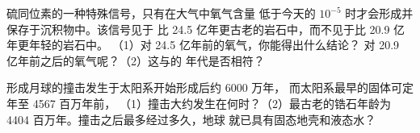 \begin{exercise}[$\star\star\star$]\label{exo:g12:early-earth:14}
 硫同位素的一种特殊信号，只有在大气中氧气含量
 低于今天的 $10^{-5}$ 时才会形成并保存于沉积物中。该信号见于
 比 24.5 亿年更古老的岩石中，而不见于比 20.9 亿年更年轻的岩石中。
 （1）对 24.5 亿年前的氧气，你能得出什么结论？
 对 20.9 亿年前之后的氧气呢？（2）这与的
 年代是否相符？
\end{exercise}

\begin{exercise}[$\star\star\star$]\label{exo:g12:early-earth:15}
 形成月球的撞击发生于太阳系开始形成后约 6000 万年，
 而太阳系最早的固体可定年至 4567 百万年前，
 （1）撞击大约发生在何时？（2）最古老的锆石年龄为 \num{4404}
 百万年。撞击之后最多经过多久，地球
 就已具有固态地壳和液态水？
\end{exercise}

